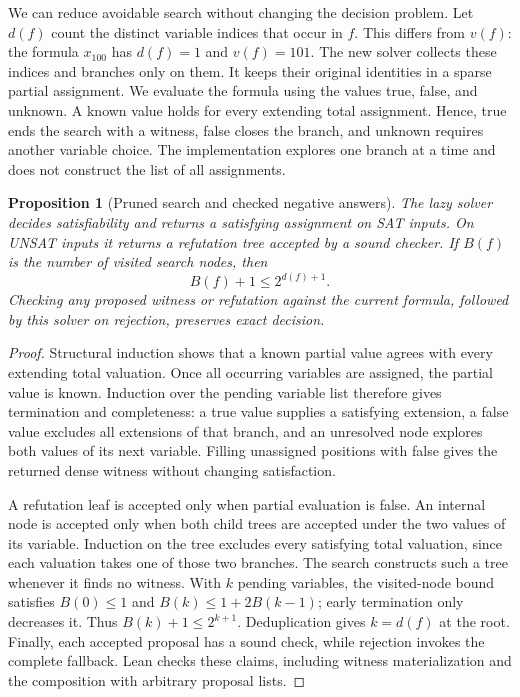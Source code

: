 \documentclass[11pt,a4paper]{article}
\numberwithin{equation}{section}
\theoremstyle{plain}
\newtheorem{proposition}[lemma]{Proposition}
\theoremstyle{definition}
\theoremstyle{remark}
\begin{document}
We can reduce avoidable search without changing the decision problem. Let $d(f)$ count the distinct variable indices that occur in $f$. This differs from $v(f)$: the formula $x_{100}$ has $d(f)=1$ and $v(f)=101$. The new solver collects these indices and branches only on them. It keeps their original identities in a sparse partial assignment. We evaluate the formula using the values true, false, and unknown. A known value holds for every extending total assignment. Hence, true ends the search with a witness, false closes the branch, and unknown requires another variable choice. The implementation explores one branch at a time and does not construct the list of all assignments.

\begin{samepage}
\begin{proposition}[Pruned search and checked negative answers]
\label{prop:lazy-search}
The lazy solver decides satisfiability and returns a satisfying assignment on SAT inputs. On UNSAT inputs it returns a refutation tree accepted by a sound checker. If $B(f)$ is the number of visited search nodes, then
\begin{equation}
B(f)+1\leq 2^{d(f)+1}.
\label{eq:lazy-nodes}
\end{equation}
Checking any proposed witness or refutation against the current formula, followed by this solver on rejection, preserves exact decision.
\end{proposition}
\end{samepage}

\begin{proof}
Structural induction shows that a known partial value agrees with every extending total valuation. Once all occurring variables are assigned, the partial value is known. Induction over the pending variable list therefore gives termination and completeness: a true value supplies a satisfying extension, a false value excludes all extensions of that branch, and an unresolved node explores both values of its next variable. Filling unassigned positions with false gives the returned dense witness without changing satisfaction.

A refutation leaf is accepted only when partial evaluation is false. An internal node is accepted only when both child trees are accepted under the two values of its variable. Induction on the tree excludes every satisfying total valuation, since each valuation takes one of those two branches. The search constructs such a tree whenever it finds no witness. With $k$ pending variables, the visited-node bound satisfies $B(0)\leq1$ and $B(k)\leq1+2B(k-1)$; early termination only decreases it. Thus $B(k)+1\leq2^{k+1}$. Deduplication gives $k=d(f)$ at the root. Finally, each accepted proposal has a sound check, while rejection invokes the complete fallback. Lean checks these claims, including witness materialization and the composition with arbitrary proposal lists.
\end{proof}
\end{document}

